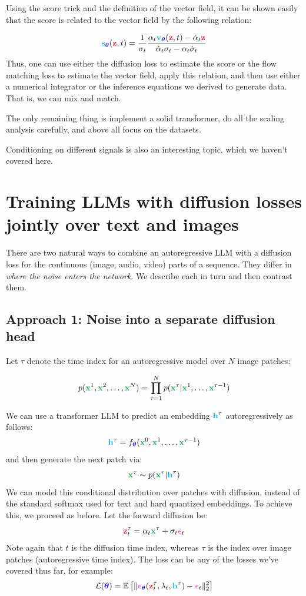 \documentclass[usenames,dvipsnames]{article}
\DeclarePairedDelimiter{\norm}{\lVert}{\rVert}
\newcommand{\myvec}[1]{\mathbf{#1}}
\newcommand{\myvecsym}[1]{\boldsymbol{#1}}
\newcommand{\vx}{\myvec{\textcolor{ForestGreen}{x}}}
\newcommand{\vz}{\myvec{\textcolor{Red}{z}}}
\newcommand{\vh}{\myvec{\textcolor{Cyan}{h}}}
\newcommand{\vs}{\myvec{\textcolor{Cyan}{s}}}
\newcommand{\vv}{\myvec{\textcolor{Cyan}{v}}}
\newcommand{\vtheta}{\myvecsym{\textcolor{blue}{\theta}}}
\newcommand{\vepsilon}{\myvecsym{\textcolor{CarnationPink}{\epsilon}}}
\newcommand{\loss}{{\cal L}}
\newcommand{\E}{\mathbb{E}} %
\newcommand{\be}{\begin{equation}}
\newcommand{\ee}{\end{equation}}
\begin{document}
Using the score trick and the definition of the vector field, it can be shown easily that the score is related to the vector field by the following relation:

\be
\vs_{\vtheta}(\vz, t) = \frac{1}{\sigma_t}
\frac{\alpha_t \vv_{\vtheta}(\vz, t) - \dot{\alpha}_t\vz}{\dot{\alpha}_t\sigma_t - \alpha_t \dot{\sigma}_t}
\ee
Thus, one can use either the diffusion loss to estimate the score or the flow matching loss to estimate the vector field, apply this relation, and then use either a numerical integrator or the inference equations we derived to generate data. That is, we can mix and match.

The only remaining thing is implement a solid transformer, do all the scaling analysis carefully, and above all focus on the datasets.

Conditioning on different signals is also an interesting topic, which we haven't covered here.



\section{Training LLMs with diffusion losses jointly over text and images}

There are two natural ways to combine an autoregressive LLM with a diffusion loss for the continuous (image, audio, video) parts of a sequence. They differ in \emph{where the noise enters the network}. We describe each in turn and then contrast them.

\subsection{Approach 1: Noise into a separate diffusion head}

Let \( \tau \) denote the time index for an autoregressive model over $N$ image patches:

\be
p(\vx^1, \vx^2, \dots,  \vx^N) = \prod_{\tau=1}^{N} p(\vx^\tau | \vx^1, \dots, \vx^{\tau-1})
\ee

We can use a transformer LLM to predict an embedding \( \vh^\tau \) autoregressively as follows:
\be
\vh^\tau = f_{\vtheta}(\vx^0, \vx^1, \dots, \vx^{\tau-1})
\ee
and then generate the next patch via:
\be
\vx^\tau \sim p(\vx^\tau | \vh^\tau)
\ee
We can model this conditional distribution over patches with diffusion, instead of the standard softmax used for text and hard quantized embeddings. To achieve this, we proceed as before. Let the forward diffusion be:
\be
\vz_t^\tau = \alpha_t \vx^\tau + \sigma_t \vepsilon_t
\ee
Note again that $t$ is the diffusion time index, whereas $\tau$ is the index over image patches (autoregressive time index). The loss can be any of the losses we've covered thus far, for example:
\be
\loss(\vtheta) = \E \left[ \norm{\vepsilon_{\vtheta} (\vz_t^\tau, \lambda_t, \vh^\tau) - \vepsilon_t }_2^2 \right]
\ee
\end{document}
